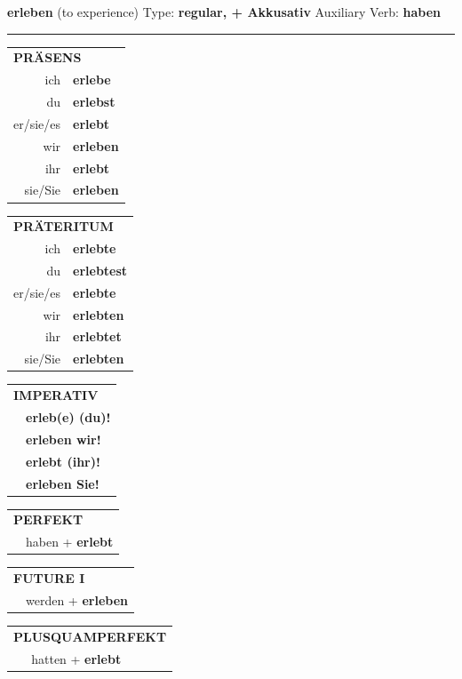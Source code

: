 \documentclass[10pt,a4paper]{revtex4-2}
\begin{document}
\begin{verbbox-acc}
{\Large \bf erleben} (to experience) \hfill Type: \textbf{regular, + Akkusativ} \hfill Auxiliary Verb: \textbf{haben}

\vspace{5pt}
\hrule
\vspace{5pt}

\begin{tabular}{rl}
\multicolumn{2}{l}{\textbf{PRÄSENS}}\\
ich & \textbf{erlebe}\\
du & \textbf{erlebst}\\
er/sie/es & \textbf{erlebt}\\
wir & \textbf{erleben}\\
ihr & \textbf{erlebt}\\
sie/Sie & \textbf{erleben}\\
\end{tabular}
\hfill
\begin{tabular}{rl}
\multicolumn{2}{l}{\textbf{PRÄTERITUM}}\\
ich & \textbf{erlebte}\\
du & \textbf{erlebtest}\\
er/sie/es & \textbf{erlebte}\\
wir & \textbf{erlebten}\\
ihr & \textbf{erlebtet}\\
sie/Sie & \textbf{erlebten}\\
\end{tabular}
\hfill
\begin{tabular}{rl}
\multicolumn{2}{l}{\textbf{IMPERATIV}}\\
& \textbf{erleb(e) (du)!}\\
& \textbf{erleben wir!}\\
& \textbf{erlebt (ihr)!}\\
& \textbf{erleben Sie!}\\
\end{tabular}

\vspace{10pt}

\begin{tabular}{rl}
\multicolumn{2}{l}{\textbf{PERFEKT}}\\
& haben + \textbf{erlebt}\\
\end{tabular}
\hfill
\begin{tabular}{rl}
\multicolumn{2}{l}{\textbf{FUTURE I}}\\
& werden + \textbf{erleben}\\
\end{tabular}
\hfill
\begin{tabular}{rl}
\multicolumn{2}{l}{\textbf{PLUSQUAMPERFEKT}}\\
& hatten + \textbf{erlebt}\\
\end{tabular}


\end{verbbox-acc}
\end{document}
